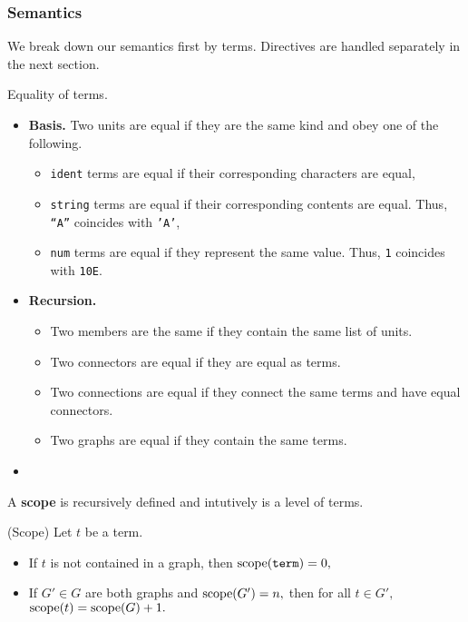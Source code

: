 \subsubsection*{Semantics}
We break down our semantics first by terms. Directives are handled separately in the next section.
\begin{definition}
Equality of terms.
\begin{itemize}
  \item \textbf{Basis.} Two units are equal if they are the same kind and obey one of the following.
	\begin{itemize}
	  \item \texttt{ident} terms are equal if their corresponding characters are equal,
      \item \texttt{string} terms are equal if their corresponding contents are equal. Thus, \texttt{``A''} coincides with \texttt{'A'},
	  \item \texttt{num} terms are equal if they represent the same value. Thus, \texttt{1} coincides with \texttt{10E}.
	\end{itemize}
  \item \textbf{Recursion.}
        \begin{itemize}
        \item Two members are the same if they contain the same list of units. %
        \item Two connectors are equal if they are equal as terms. %
 		  \item Two connections are equal if they connect the same terms and have equal connectors.
		  \item Two graphs are equal if they contain the same terms.
	\end{itemize}

\item
\end{itemize}
\end{definition}
A \textbf{scope} is recursively defined and intutively is a level of terms.
\begin{definition} (Scope)
 Let $t$ be a term.
  \begin{itemize}
	\item If $t$ is not contained in a graph, then $\textrm{scope}(\texttt{term}) = 0,$
	\item If $G' \in G$ are both graphs and $\textrm{scope}(G') = n,$ then for all $t \in G',$ $\textrm{scope}(t) = \textrm{scope}(G) + 1.$
\end{itemize}
\end{definition}
